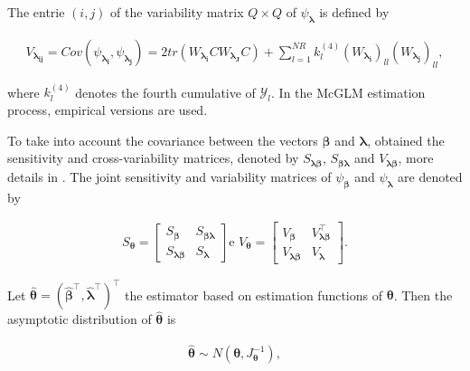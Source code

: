 \documentclass[AMA,STIX1COL]{WileyNJD-v2}
\begin{document}
\noindent The entrie $(i,j)$ of the variability matrix $Q \times Q$ of $\psi_{\boldsymbol{\lambda}}$ is defined by

$$
  \begin{aligned}
V_{\boldsymbol{\lambda_{ij}}} = Cov\left ( \psi_{\boldsymbol{\lambda_{i}}}, \psi_{\boldsymbol{\lambda_{j}}} \right) = 2tr(W_{\boldsymbol{\lambda_{i}}} CW_{\boldsymbol{\lambda_{J}}} C) + \sum_{l=1}^{NR} k_{l}^{(4)} (W_{\boldsymbol{\lambda_{i}}})_{ll} (W_{\boldsymbol{\lambda_{j}}})_{ll},
  \end{aligned}
$$

\noindent where $k_{l}^{(4)}$ denotes the fourth cumulative of $\mathcal{Y}_{l}$. In the McGLM estimation process, empirical versions are used.

To take into account the covariance between the vectors $\boldsymbol{\beta}$ and $\boldsymbol{\lambda}$, \cite{Bonat16} obtained the sensitivity and cross-variability matrices, denoted by $S_{\boldsymbol{ \lambda \beta}}$, $S_{\boldsymbol{\beta \lambda}}$ and $V_{\boldsymbol{\lambda \beta}}$, more details in \cite{Bonat16}. The joint sensitivity and variability matrices of $\psi_{\boldsymbol{\beta}}$ and $\psi_{\boldsymbol{\lambda}}$ are denoted by

$$
  \begin{aligned}
    S_{\boldsymbol{\theta}} = \begin{bmatrix}
      S_{\boldsymbol{\beta}} & S_{\boldsymbol{\beta\lambda}} \\ 
      S_{\boldsymbol{\lambda\beta}} & S_{\boldsymbol{\lambda}} 
      \end{bmatrix} \text{e } V_{\boldsymbol{\theta}} = \begin{bmatrix}
      V_{\boldsymbol{\beta}} & V^{\top}_{\boldsymbol{\lambda\beta}} \\ 
      V_{\boldsymbol{\lambda\beta}} & V_{\boldsymbol{\lambda}} 
    \end{bmatrix}.
  \end{aligned}
$$

Let $\boldsymbol{\hat{\theta}} = (\boldsymbol{\hat{\beta}^{\top}}, \boldsymbol{\hat{\lambda}^{\top}})^{\top }$ the estimator based on estimation functions of $\boldsymbol{\theta}$. Then the asymptotic distribution of $\boldsymbol{\hat{\theta}}$ is

$$
  \begin{aligned}
    \boldsymbol{\hat{\theta}} \sim N(\boldsymbol{\theta}, J_{\boldsymbol{\theta}}^{-1}),
  \end{aligned}
$$
\end{document}
